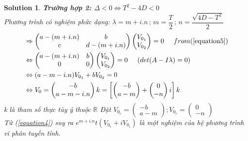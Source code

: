 \documentclass[a4paper]{article}
\newtheorem*{sol}{Solution}
\begin{document}
\begin{sol}
\textbf{Trường hợp 2: $ \Delta < 0 \Leftrightarrow T^2 - 4D < 0$}\\
Phương trình có nghiệm phức dạng: $\lambda= m+ i.n\, ;\, m=\dfrac{T}{2}\, ;\, n=\dfrac{\sqrt{4D- T^{2}}}{2}$ \\
\begin{align*}
    &\Rightarrow \begin{pmatrix}
    a- (m+i.n) &b \\ 
    c& d-(m+i.n)
    \end{pmatrix} \begin{pmatrix}
    V_{0_1}\\ V_{0_2} 
    \end{pmatrix}=0 \hspace{0.5cm} from (\ref{equation5})\\
    &\Leftrightarrow \begin{pmatrix}
    a- (m+i.n)&b \\
    0& 0
    \end{pmatrix}\begin{pmatrix}
    V_{0_1}\\ V_{0_2} 
    \end{pmatrix}= 0 \hspace{0.5cm} (det(A - I \lambda)=0)\\
    &\Leftrightarrow (a-m-i.n)V_{0_1}+b V_{0_2}=0\\
    &\Leftrightarrow V_0 = \begin{pmatrix}
    -b\\a-m-i.n 
    \end{pmatrix}k=\begin{bmatrix}
    \begin{pmatrix}
    -b\\ a-m 
    \end{pmatrix} + \begin{pmatrix}
    0\\-n 
    \end{pmatrix}i
    \end{bmatrix}k
\end{align*}
k là tham số thực tùy ý thuộc $\mathbb{R}$
Đặt $V_{0_r}=\begin{pmatrix}
    -b \\ a-m
\end{pmatrix} ; V_{0_r}=\begin{pmatrix}
    0 \\-n
\end{pmatrix}$\\
Từ (\ref{equation4}) suy ra $e^{m+i.n}t(V_{0_r}+iV_{0_i})$ là một nghiệm của hệ phương trình vi phân tuyến tính.

\end{sol}
\end{document}
